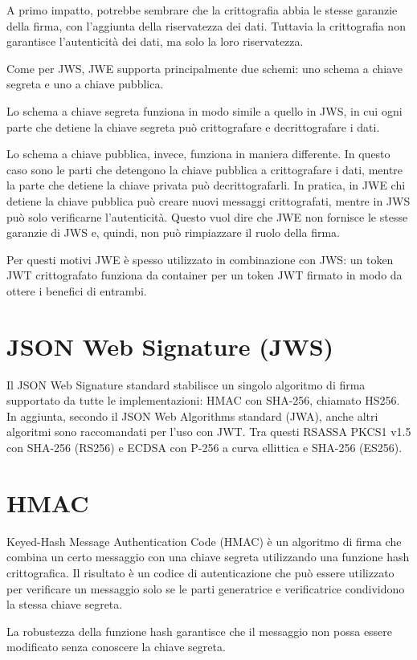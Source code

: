 \documentclass{article}
\begin{document}
A primo impatto, potrebbe sembrare che la crittografia abbia le stesse garanzie della firma, con l'aggiunta della riservatezza dei dati.
Tuttavia la crittografia non garantisce l'autenticità dei dati, ma solo la loro riservatezza.

Come per JWS, JWE supporta principalmente due schemi: uno schema a chiave segreta e uno a chiave pubblica.

Lo schema a chiave segreta funziona in modo simile a quello in JWS, in cui ogni parte che detiene la chiave segreta può crittografare e decrittografare i dati.

Lo schema a chiave pubblica, invece, funziona in maniera differente.
In questo caso sono le parti che detengono la chiave pubblica a crittografare i dati, mentre la parte che detiene la chiave privata può decrittografarli.
In pratica, in JWE chi detiene la chiave pubblica può creare nuovi messaggi crittografati, mentre in JWS può solo verificarne l'autenticità.
Questo vuol dire che JWE non fornisce le stesse garanzie di JWS e, quindi, non può rimpiazzare il ruolo della firma.

Per questi motivi JWE è spesso utilizzato in combinazione con JWS: un token JWT crittografato funziona da container per un token JWT firmato in modo da ottere i benefici di entrambi.

\section{JSON Web Signature (JWS)}
Il JSON Web Signature standard stabilisce un singolo algoritmo di firma supportato da tutte le implementazioni: HMAC con SHA-256, chiamato HS256.
In aggiunta, secondo il JSON Web Algorithms standard (JWA), anche altri algoritmi sono raccomandati per l'uso con JWT.
Tra questi RSASSA PKCS1 v1.5 con SHA-256 (RS256) e ECDSA con P-256 a curva ellittica e SHA-256 (ES256).

\section{HMAC}
Keyed-Hash Message Authentication Code (HMAC) è un algoritmo di firma che combina un certo messaggio con una chiave segreta utilizzando una funzione hash crittografica.
Il risultato è un codice di autenticazione che può essere utilizzato per verificare un messaggio solo se le parti generatrice e verificatrice condividono la stessa chiave segreta.

La robustezza della funzione hash garantisce che il messaggio non possa essere modificato senza conoscere la chiave segreta.
\end{document}
